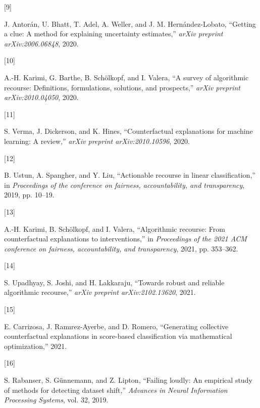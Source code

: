 \documentclass[
  conference]{IEEEtran}
\newlength{\cslhangindent}
\newlength{\csllabelwidth}
\newlength{\cslentryspacingunit} %
\newenvironment{CSLReferences}[2] %
 {%
  \setlength{\parindent}{0pt}
  \ifodd #1
  \let\oldpar\par
  \def\par{\hangindent=\cslhangindent\oldpar}
  \fi
  \setlength{\parskip}{#2\cslentryspacingunit}
 }%
 {}
\newcommand{\CSLLeftMargin}[1]{\parbox[t]{\csllabelwidth}{#1}}
\newcommand{\CSLRightInline}[1]{\parbox[t]{\linewidth - \csllabelwidth}{#1}\break}
\begin{document}
\begin{CSLReferences}{0}{0}
\leavevmode{}%
\CSLLeftMargin{{[}9{]} }%
\CSLRightInline{J. Antorán, U. Bhatt, T. Adel, A. Weller, and J. M.
Hernández-Lobato, {``Getting a clue: A method for explaining uncertainty
estimates,''} \emph{arXiv preprint arXiv:2006.06848}, 2020.}

\leavevmode{}%
\CSLLeftMargin{{[}10{]} }%
\CSLRightInline{A.-H. Karimi, G. Barthe, B. Schölkopf, and I. Valera,
{``A survey of algorithmic recourse: Definitions, formulations,
solutions, and prospects,''} \emph{arXiv preprint arXiv:2010.04050},
2020.}

\leavevmode{}%
\CSLLeftMargin{{[}11{]} }%
\CSLRightInline{S. Verma, J. Dickerson, and K. Hines, {``Counterfactual
explanations for machine learning: A review,''} \emph{arXiv preprint
arXiv:2010.10596}, 2020.}

\leavevmode{}%
\CSLLeftMargin{{[}12{]} }%
\CSLRightInline{B. Ustun, A. Spangher, and Y. Liu, {``Actionable
recourse in linear classification,''} in \emph{Proceedings of the
conference on fairness, accountability, and transparency}, 2019, pp.
10--19.}

\leavevmode{}%
\CSLLeftMargin{{[}13{]} }%
\CSLRightInline{A.-H. Karimi, B. Schölkopf, and I. Valera,
{``Algorithmic recourse: From counterfactual explanations to
interventions,''} in \emph{Proceedings of the 2021 ACM conference on
fairness, accountability, and transparency}, 2021, pp. 353--362.}

\leavevmode{}%
\CSLLeftMargin{{[}14{]} }%
\CSLRightInline{S. Upadhyay, S. Joshi, and H. Lakkaraju, {``Towards
robust and reliable algorithmic recourse,''} \emph{arXiv preprint
arXiv:2102.13620}, 2021.}

\leavevmode{}%
\CSLLeftMargin{{[}15{]} }%
\CSLRightInline{E. Carrizosa, J. Ramırez-Ayerbe, and D. Romero,
{``Generating collective counterfactual explanations in score-based
classification via mathematical optimization,''} 2021.}

\leavevmode{}%
\CSLLeftMargin{{[}16{]} }%
\CSLRightInline{S. Rabanser, S. Günnemann, and Z. Lipton, {``Failing
loudly: An empirical study of methods for detecting dataset shift,''}
\emph{Advances in Neural Information Processing Systems}, vol. 32,
2019.}


\end{CSLReferences}
\end{document}
